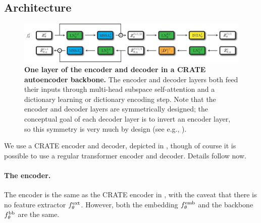 \documentclass[../../book-main.tex]{subfiles}
\begin{document}
\subsection{Architecture}\label{sub:image_completion_architecture}

\begin{figure}
    \centering 
    \includegraphics[width=\textwidth]{figs_chap7/crate_ae_backbone.pdf}
    \caption{\small\textbf{One layer of the encoder and decoder in a CRATE autoencoder backbone.} The encoder and decoder layers both feed their inputs through multi-head subspace self-attention and a dictionary learning or dictionary encoding step. Note that the encoder and decoder layers are symmetrically designed; the conceptual goal of each decoder layer is to invert an encoder layer, so this symmetry is very much by design (see e.g., ).}
\end{figure}

We use a CRATE encoder and decoder, depicted in , though of course it is possible to use a regular transformer encoder and decoder. Details follow now.

\paragraph{The encoder.} The encoder is the same as the CRATE encoder in , with the caveat that there is no feature extractor \(f_{\theta}^{\mathrm{ext}}\). However, both the embedding \(f_{\theta}^{\mathrm{emb}}\) and the backbone \(f_{\theta}^{\mathrm{bb}}\) are the same.
\end{document}
